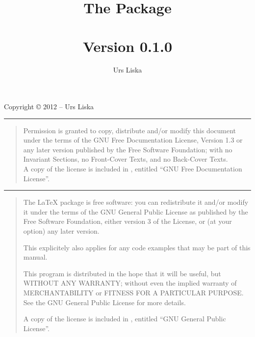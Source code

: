 \documentclass{article}
\begin{document}
\newcommand{\glyphlist}[3]{%
	\begin{figure}[htbp]
		\centering
		\texttt{[image: glyphlist/resources/\#3]}
		\caption{#1}
		\label{fig:#2}
	\end{figure}
}


\title{The \lilyglyphs Package\\~\\
	\normalsize Version 0.1.0}
\author{Urs Liska}

\maketitle

\pagebreak

\label{copyright}

\noindent Copyright \copyright{} 2012 -- Urs Liska

\medskip
\hrule

\begin{quote}
Permission is granted to copy, distribute and/or modify this document
under the terms of the GNU Free Documentation License, Version 1.3
or any later version published by the Free Software Foundation;
with no Invariant Sections, no Front-Cover Texts, and no Back-Cover Texts.\\
A copy of the license is included in , entitled \enquote{GNU Free Documentation License}.
\end{quote}

\hrule

\begin{quote}
The \lilyglyphs{} \LaTeX{} package is free software: you can redistribute it and/or modify  
it under the terms of the GNU General Public License as published by  
the Free Software Foundation, either version 3 of the License, or     
(at your option) any later version.         
  
This explicitely also applies for any code examples that may be part of this manual.
                                                                        
This program is distributed in the hope that it will be useful,       
but WITHOUT ANY WARRANTY; without even the implied warranty of        
MERCHANTABILITY or FITNESS FOR A PARTICULAR PURPOSE. See the          
GNU General Public License for more details.                          

A copy of the license is included in , entitled \enquote{GNU
General Public License}.

\end{quote}
\end{document}
